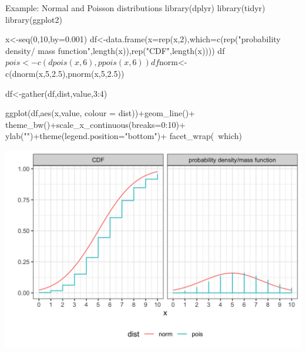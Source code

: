 \documentclass[a4,11pt]{beamer}
\newenvironment{code}%
   {\small\snugshade\verbatim}%
   {\endverbatim\endsnugshade}
\begin{document}
\begin{frame}[fragile]{Example: Normal and Poisson distributions}
 \vspace{-.4cm}   \begin{code}
library(dplyr)
library(tidyr)
library(ggplot2)

x<-seq(0,10,by=0.001)
df<-data.frame(x=rep(x,2),which=c(rep("probability density/
        mass function",length(x)),rep("CDF",length(x))))
df$pois<-c(dpois(x,6),ppois(x,6))
df$norm<-c(dnorm(x,5,2.5),pnorm(x,5,2.5))

df<-gather(df,dist,value,3:4) %

ggplot(df,aes(x,value, colour = dist))+geom_line()+ 
  theme_bw()+scale_x_continuous(breaks=0:10)+
  ylab("")+theme(legend.position="bottom")+
  facet_wrap(~which)
    \end{code}
\end{frame}

\begin{frame}
        \hspace*{-.07\linewidth}\includegraphics[width=1.1\linewidth]{graphics/cdf.png}
\end{frame}
\end{document}
